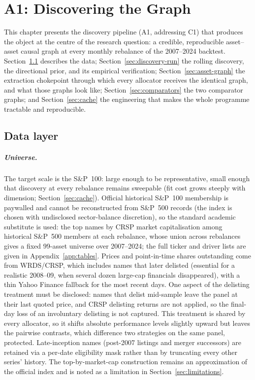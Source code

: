 \chapter{A1: Discovering the Graph}
\label{chap:discovery}

This chapter presents the discovery pipeline (A1, addressing C1) that produces
the object at the centre of the research question: a credible, reproducible
asset--asset causal
graph at every monthly rebalance of the 2007--2024 backtest.
Section~\ref{sec:data} describes the data; Section~\ref{sec:discovery-run} the
rolling discovery, the directional prior, and its empirical verification;
Section~\ref{sec:asset-graph} the extraction chokepoint through which every
allocator receives the identical graph, and what those graphs look like;
Section~\ref{sec:comparators} the two comparator graphs; and
Section~\ref{sec:cache} the engineering
that makes the whole programme tractable and reproducible.

\section{Data layer}
\label{sec:data}

\paragraph{Universe.} The target scale is the S\&P~100: large enough to be
representative, small enough that discovery at every rebalance remains
sweepable (fit cost grows steeply with dimension;
Section~\ref{sec:cache}). Official historical S\&P~100 membership is
paywalled and cannot be reconstructed from S\&P~500 records (the index is
chosen with undisclosed sector-balance discretion), so the standard
academic substitute is used: the top names by CRSP market capitalisation
among historical S\&P~500 members at each rebalance, whose union across
rebalances gives a fixed 99-asset universe over 2007--2024; the full
ticker and driver lists are given in Appendix~\ref{app:tables}. Prices and
point-in-time shares outstanding come from WRDS/CRSP, which includes names
that later delisted (essential for a realistic 2008--09, when several dozen
large-cap financials disappeared), with a thin Yahoo Finance fallback for
the most recent days. One aspect of the delisting treatment must be
disclosed: names that delist mid-sample leave the panel at their last
quoted price, and CRSP delisting returns are not applied, so the final-day
loss of an involuntary delisting is not captured. This treatment is shared
by every allocator, so it shifts absolute performance levels slightly
upward but leaves the pairwise contrasts, which difference two strategies
on the same panel, protected. Late-inception names (post-2007 listings and merger
successors) are retained via a per-date eligibility mask rather than by
truncating every other series' history. The top-by-market-cap construction
remains an approximation of the official index and is noted as a limitation
in Section~\ref{sec:limitations}.

